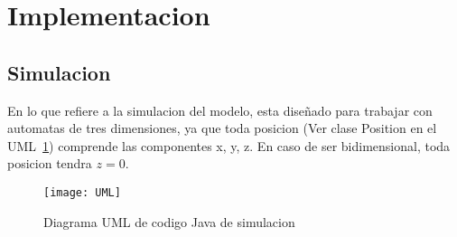 \section{Implementacion}\label{sec:implementacion}

\subsection{Simulacion}\label{subsec:simulacion}

    En lo que refiere a la simulacion del modelo, esta diseñado para trabajar con automatas de tres dimensiones, ya que
    toda posicion (Ver clase Position en el UML~\ref{fig:UML-Simulacion}) comprende las componentes x, y, z. En caso de ser
    bidimensional, toda posicion tendra $z = 0$.



\begin{figure}[H]
    \centering
    \texttt{[image: UML]}
    \caption{Diagrama UML de codigo Java de simulacion}
    \label{fig:UML-Simulacion}
\end{figure}
